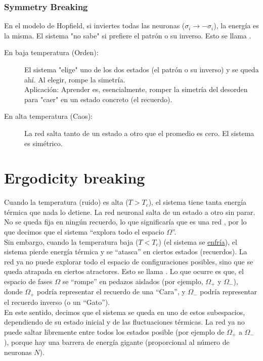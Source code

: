 \subsubsection{Symmetry Breaking}
\noindent
En el modelo de Hopfield, si inviertes todas las neuronas ($\sigma_i \to -\sigma_i$), la energía es la misma. El sistema "no sabe" si prefiere el patrón o su inverso. Esto se llama . \\

\begin{description}
    \item[En baja temperatura (Orden):] El sistema "elige" uno de los dos estados (el patrón o su inverso) y se queda ahí. Al elegir, rompe la simetría. \\
    \noindent
    Aplicación: Aprender es, esencialmente, romper la simetría del desorden para "caer" en un estado concreto (el recuerdo).
    \item[En alta temperatura (Caos):] La red salta tanto de un estado a otro que el promedio es cero. El sistema es simétrico. \\
\end{description}

\section{Ergodicity breaking}
\noindent
Cuando la temperatura (ruido) es alta ($T > T_c$), el sistema tiene tanta energía térmica que nada lo detiene. La red neuronal salta de un estado a otro sin parar. No se queda fija en ningún recuerdo, lo que significaría que es una red , por lo que decimos que el sistema ``explora todo el espacio $\Omega$''. \\

\noindent
Sin embargo, cuando la temperatura baja ($T < T_c$) (el sistema se \underline{enfría}), el sistema pierde energía térmica y se ``atasca'' en ciertos estados (recuerdos). La red ya no puede explorar todo el espacio de configuraciones posibles, sino que se queda atrapada en ciertos atractores. Esto se llama . Lo que ocurre es que, el espacio de fases $\Omega$ se ``rompe'' en pedazos aislados (por ejemplo, $\Omega_+$ y $\Omega_-$), donde $\Omega_+$ podría representar el recuerdo de una ``Cara'', y $\Omega_-$ podría representar el recuerdo inverso (o un ``Gato''). \\

\noindent
En este sentido, decimos que el sistema se queda  en uno de estos subespacios, dependiendo de su estado inicial y de las fluctuaciones térmicas. La red ya no puede saltar libremente entre todos los estados posible (por ejemplo de $\Omega_+$ a $\Omega_-$), porque hay una barrera de energía gigante (proporcional al número de neuronas $N$). \\

